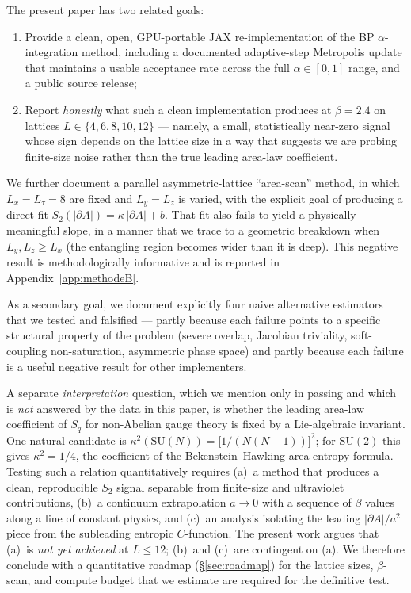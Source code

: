 \documentclass[11pt,a4paper]{article}
\theoremstyle{definition}
\newcommand{\SUtwo}{\mathrm{SU}(2)}
\newcommand{\SUN}{\mathrm{SU}(N)}
\begin{document}
\medskip

The present paper has two related goals:
\begin{enumerate}
\item Provide a clean, open, GPU-portable JAX re-implementation of
      the BP $\alpha$-integration method, including a documented
      adaptive-step Metropolis update that maintains a usable
      acceptance rate across the full $\alpha \in [0,1]$ range, and
      a public source release;
\item Report \emph{honestly} what such a clean implementation
      produces at $\beta = 2.4$ on lattices $L \in \{4,6,8,10,12\}$
      --- namely, a small, statistically near-zero signal whose sign
      depends on the lattice size in a way that suggests we are
      probing finite-size noise rather than the true leading
      area-law coefficient.
\end{enumerate}
We further document a parallel asymmetric-lattice ``area-scan''
method, in which $L_x = L_\tau = 8$ are fixed and $L_y = L_z$ is
varied, with the explicit goal of producing a direct fit
$S_2(|\partial A|) = \kappa\,|\partial A| + b$. That fit also fails
to yield a physically meaningful slope, in a manner that we trace to
a geometric breakdown when $L_y, L_z \ge L_x$ (the entangling region
becomes wider than it is deep). This negative result is
methodologically informative and is reported in
Appendix~\ref{app:methodeB}.

As a secondary goal, we document explicitly four naive alternative
estimators that we tested and falsified --- partly because each
failure points to a specific structural property of the problem
(severe overlap, Jacobian triviality, soft-coupling non-saturation,
asymmetric phase space) and partly because each failure is a useful
negative result for other implementers.

\medskip

A separate \emph{interpretation} question, which we mention only in
passing and which is \emph{not} answered by the data in this paper,
is whether the leading area-law coefficient of $S_q$ for non-Abelian
gauge theory is fixed by a Lie-algebraic invariant. One natural
candidate \cite{KR2026} is $\kappa^{2}(\SUN) = \bigl[1/(N(N-1))\bigr]^{2}$;
for $\SUtwo$ this gives $\kappa^{2} = 1/4$, the coefficient of the
Bekenstein--Hawking area-entropy formula. Testing such a relation
quantitatively requires (a)~a method that produces a clean,
reproducible $S_2$ signal separable from finite-size and ultraviolet
contributions, (b)~a continuum extrapolation $a \to 0$ with a
sequence of $\beta$ values along a line of constant physics, and
(c)~an analysis isolating the leading $|\partial A|/a^{2}$ piece
from the subleading entropic $C$-function. The present work argues
that (a)~is \emph{not yet achieved} at $L \le 12$; (b)~and (c)~are
contingent on (a). We therefore conclude with a quantitative roadmap
(\S\ref{sec:roadmap}) for the lattice sizes, $\beta$-scan, and
compute budget that we estimate are required for the definitive
test.
\end{document}
